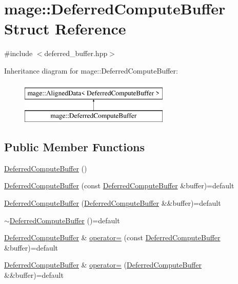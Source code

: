 \hypertarget{structmage_1_1_deferred_compute_buffer}{}\section{mage\+:\+:Deferred\+Compute\+Buffer Struct Reference}
\label{structmage_1_1_deferred_compute_buffer}


{\ttfamily \#include $<$deferred\+\_\+buffer.\+hpp$>$}

Inheritance diagram for mage\+:\+:Deferred\+Compute\+Buffer\+:\begin{figure}[H]
\begin{center}
\leavevmode
\includegraphics[height=2.000000cm]{structmage_1_1_deferred_compute_buffer}
\end{center}
\end{figure}
\subsection*{Public Member Functions}
\begin{DoxyCompactItemize}
\item 
\hyperlink{structmage_1_1_deferred_compute_buffer_aaab6ca76eb31d7be6f7a9c6f549d5566}{Deferred\+Compute\+Buffer} ()
\item 
\hyperlink{structmage_1_1_deferred_compute_buffer_a95255bfbcf43f16fc7f6fac75ef293f4}{Deferred\+Compute\+Buffer} (const \hyperlink{structmage_1_1_deferred_compute_buffer}{Deferred\+Compute\+Buffer} \&buffer)=default
\item 
\hyperlink{structmage_1_1_deferred_compute_buffer_ab607d7a0f46a321f0693c19913b8bb0d}{Deferred\+Compute\+Buffer} (\hyperlink{structmage_1_1_deferred_compute_buffer}{Deferred\+Compute\+Buffer} \&\&buffer)=default
\item 
\hyperlink{structmage_1_1_deferred_compute_buffer_a7a554e0b06c201549bb9a1dc834d3b95}{$\sim$\+Deferred\+Compute\+Buffer} ()=default
\item 
\hyperlink{structmage_1_1_deferred_compute_buffer}{Deferred\+Compute\+Buffer} \& \hyperlink{structmage_1_1_deferred_compute_buffer_a5ba8f51e5e5ee0561817cdcdc782009e}{operator=} (const \hyperlink{structmage_1_1_deferred_compute_buffer}{Deferred\+Compute\+Buffer} \&buffer)=default
\item 
\hyperlink{structmage_1_1_deferred_compute_buffer}{Deferred\+Compute\+Buffer} \& \hyperlink{structmage_1_1_deferred_compute_buffer_aba88894e51c04f27b75b5c355a39d31a}{operator=} (\hyperlink{structmage_1_1_deferred_compute_buffer}{Deferred\+Compute\+Buffer} \&\&buffer)=default
\end{DoxyCompactItemize}
